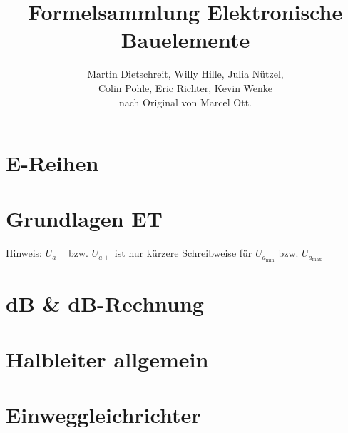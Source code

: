 

\hfuzz=10pt
\newcommand*{\bfrac}[2]{\genfrac{}{}{0pt}{}{#1}{#2}}
\setlength{\extrarowheight}{2pt}


\frontmatter
\title{Formelsammlung Elektronische Bauelemente}
\author{Martin Dietschreit, Willy Hille, Julia Nützel,\\
Colin Pohle, Eric Richter, Kevin Wenke\\
nach Original von Marcel Ott.}
\maketitle
\vfuzz=10pt
\tableofcontents
\vfuzz=0.1pt

\mainmatter
\section{E-Reihen}
    
\section{Grundlagen ET}
    
    Hinweis: $U_{a-}$ bzw. $U_{a+}$ ist nur kürzere Schreibweise für $U_{a_{\min}}$ bzw. $U_{a_{\max}}$
\section{dB \& dB-Rechnung} %
    
\section{Halbleiter allgemein}\label{sec:halbleiter}
    
\section{Einweggleichrichter}\label{sec:Einweggleichrichter}
    

